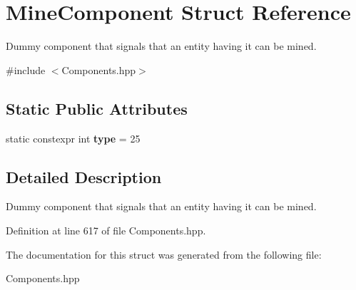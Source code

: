 \hypertarget{struct_mine_component}{}\section{Mine\+Component Struct Reference}
\label{struct_mine_component}


Dummy component that signals that an entity having it can be mined.  




{\ttfamily \#include $<$Components.\+hpp$>$}

\subsection*{Static Public Attributes}
\begin{DoxyCompactItemize}
\item 
static constexpr int {\bfseries type} = 25\hypertarget{struct_mine_component_a875d1a13fd67728798e8544597176c25}{}\label{struct_mine_component_a875d1a13fd67728798e8544597176c25}

\end{DoxyCompactItemize}


\subsection{Detailed Description}
Dummy component that signals that an entity having it can be mined. 

Definition at line 617 of file Components.\+hpp.



The documentation for this struct was generated from the following file\+:\begin{DoxyCompactItemize}
\item 
Components.\+hpp\end{DoxyCompactItemize}
